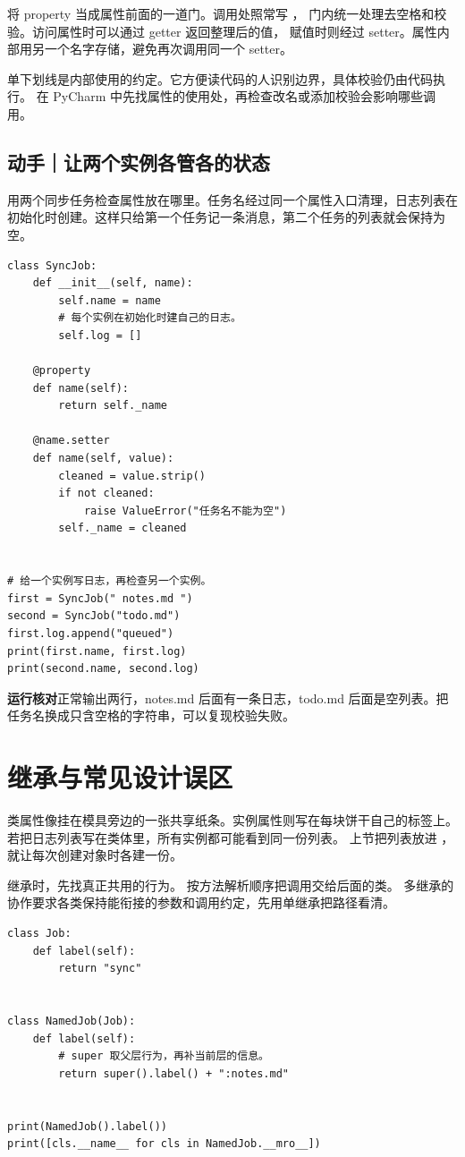 \documentclass[UTF8,a4paper,oneside,openany,fontset=none,11pt]{ctexbook}
\newcommand{\code}[1]{\texttt{\detokenize{#1}}}
\begin{document}
将 property 当成属性前面的一道门。调用处照常写 \code{job.name = value}，
门内统一处理去空格和校验。访问属性时可以通过 getter 返回整理后的值，
赋值时则经过 setter。属性内部用另一个名字存储，避免再次调用同一个 setter。

单下划线是内部使用的约定。它方便读代码的人识别边界，具体校验仍由代码执行。
在 PyCharm 中先找属性的使用处，再检查改名或添加校验会影响哪些调用。

\subsection*{动手｜让两个实例各管各的状态}

用两个同步任务检查属性放在哪里。任务名经过同一个属性入口清理，日志列表在初始化时创建。这样只给第一个任务记一条消息，第二个任务的列表就会保持为空。

\begin{lstlisting}[title={\code{sync_jobs.py}}]
class SyncJob:
    def __init__(self, name):
        self.name = name
        # 每个实例在初始化时建自己的日志。
        self.log = []

    @property
    def name(self):
        return self._name

    @name.setter
    def name(self, value):
        cleaned = value.strip()
        if not cleaned:
            raise ValueError("任务名不能为空")
        self._name = cleaned


# 给一个实例写日志，再检查另一个实例。
first = SyncJob(" notes.md ")
second = SyncJob("todo.md")
first.log.append("queued")
print(first.name, first.log)
print(second.name, second.log)
\end{lstlisting}

\textbf{运行核对}\enspace 正常输出两行，notes.md 后面有一条日志，todo.md 后面是空列表。把任务名换成只含空格的字符串，可以复现校验失败。

\section{继承与常见设计误区}

类属性像挂在模具旁边的一张共享纸条。实例属性则写在每块饼干自己的标签上。
若把日志列表写在类体里，所有实例都可能看到同一份列表。
上节把列表放进 \code{__init__}，就让每次创建对象时各建一份。

继承时，先找真正共用的行为。\code{super()} 按方法解析顺序把调用交给后面的类。
多继承的协作要求各类保持能衔接的参数和调用约定，先用单继承把路径看清。


\begin{lstlisting}[title={\code{inherit_name.py}}]
class Job:
    def label(self):
        return "sync"


class NamedJob(Job):
    def label(self):
        # super 取父层行为，再补当前层的信息。
        return super().label() + ":notes.md"


print(NamedJob().label())
print([cls.__name__ for cls in NamedJob.__mro__])
\end{lstlisting}
\end{document}
